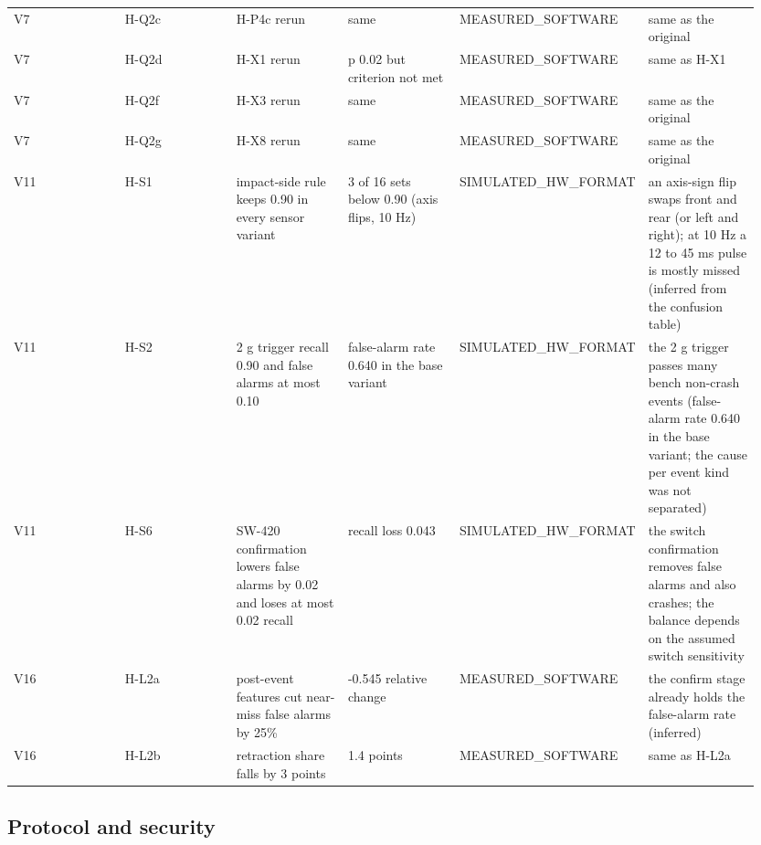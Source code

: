 {\begin{longtable}{p{0.158\linewidth}p{0.158\linewidth}p{0.158\linewidth}p{0.158\linewidth}p{0.158\linewidth}p{0.158\linewidth}}
V7 & H-Q2c & H-P4c rerun & same & MEASURED\_SOFTWARE & same as the original \\
V7 & H-Q2d & H-X1 rerun & p 0.02 but criterion not met & MEASURED\_SOFTWARE & same as H-X1 \\
V7 & H-Q2f & H-X3 rerun & same & MEASURED\_SOFTWARE & same as the original \\
V7 & H-Q2g & H-X8 rerun & same & MEASURED\_SOFTWARE & same as the original \\
V11 & H-S1 & impact-side rule keeps 0.90 in every sensor variant & 3 of 16 sets below 0.90 (axis flips, 10 Hz) & SIMULATED\_HW\_FORMAT & an axis-sign flip swaps front and rear (or left and right); at 10 Hz a 12 to 45 ms pulse is mostly missed (inferred from the confusion table) \\
V11 & H-S2 & 2 g trigger recall 0.90 and false alarms at most 0.10 & false-alarm rate 0.640 in the base variant & SIMULATED\_HW\_FORMAT & the 2 g trigger passes many bench non-crash events (false-alarm rate 0.640 in the base variant; the cause per event kind was not separated) \\
V11 & H-S6 & SW-420 confirmation lowers false alarms by 0.02 and loses at most 0.02 recall & recall loss 0.043 & SIMULATED\_HW\_FORMAT & the switch confirmation removes false alarms and also crashes; the balance depends on the assumed switch sensitivity \\
V16 & H-L2a & post-event features cut near-miss false alarms by 25\% & -0.545 relative change & MEASURED\_SOFTWARE & the confirm stage already holds the false-alarm rate (inferred) \\
V16 & H-L2b & retraction share falls by 3 points & 1.4 points & MEASURED\_SOFTWARE & same as H-L2a \\
\bottomrule
\end{longtable}}

\subsection*{Protocol and security}


